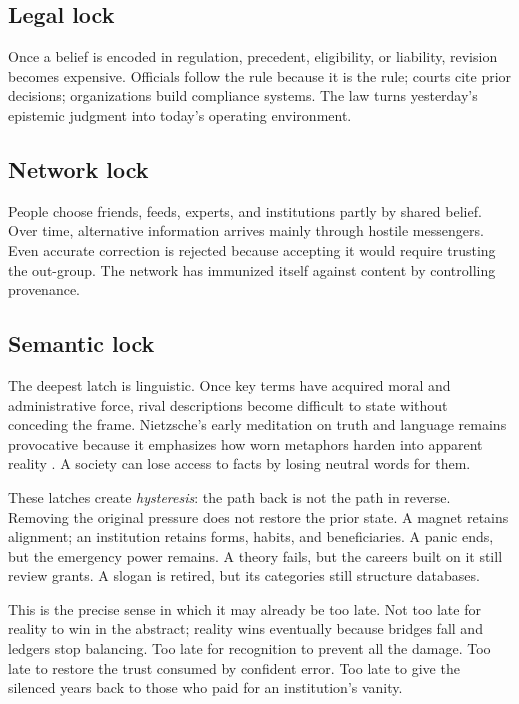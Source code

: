 ﻿\documentclass[12pt,a4paper]{book}
\begin{document}
\subsection{Legal lock}

Once a belief is encoded in regulation, precedent, eligibility, or liability, revision becomes expensive. Officials follow the rule because it is the rule; courts cite prior decisions; organizations build compliance systems. The law turns yesterday's epistemic judgment into today's operating environment.

\subsection{Network lock}

People choose friends, feeds, experts, and institutions partly by shared belief. Over time, alternative information arrives mainly through hostile messengers. Even accurate correction is rejected because accepting it would require trusting the out-group. The network has immunized itself against content by controlling provenance.

\subsection{Semantic lock}

The deepest latch is linguistic. Once key terms have acquired moral and administrative force, rival descriptions become difficult to state without conceding the frame. Nietzsche's early meditation on truth and language remains provocative because it emphasizes how worn metaphors harden into apparent reality \cite{Nietzsche-WahrheitLuege}. A society can lose access to facts by losing neutral words for them.

These latches create \emph{hysteresis}: the path back is not the path in reverse. Removing the original pressure does not restore the prior state. A magnet retains alignment; an institution retains forms, habits, and beneficiaries. A panic ends, but the emergency power remains. A theory fails, but the careers built on it still review grants. A slogan is retired, but its categories still structure databases.

This is the precise sense in which it may already be too late. Not too late for reality to win in the abstract; reality wins eventually because bridges fall and ledgers stop balancing. Too late for recognition to prevent all the damage. Too late to restore the trust consumed by confident error. Too late to give the silenced years back to those who paid for an institution's vanity.
\end{document}
